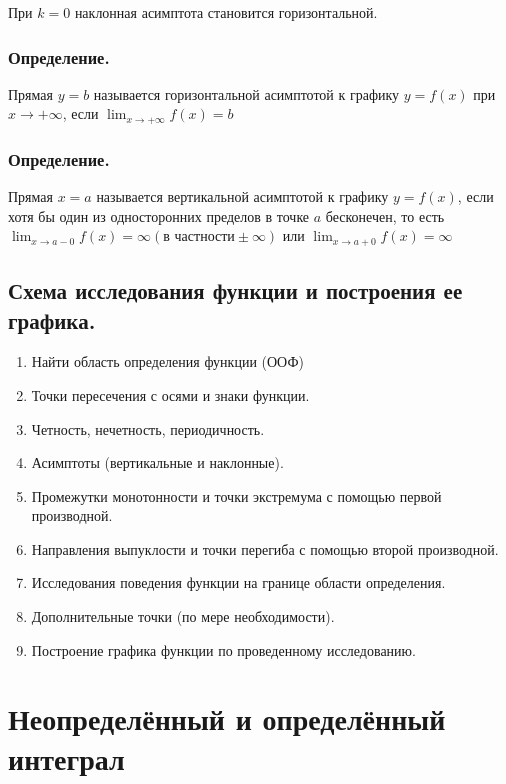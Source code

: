 \documentclass[a4paper,12pt]{article}
\theoremstyle{plain} %
\theoremstyle{definition} %
\theoremstyle{remark} %
\begin{document}
При $k = 0$ наклонная асимптота становится горизонтальной.

\subsubsection*{Определение.}
Прямая $y = b$ называется горизонтальной асимптотой к графику $y = f(x)$ при $x \rightarrow +\infty$, если $\lim_{x \rightarrow +\infty} f(x) = b$

\subsubsection*{Определение.}
Прямая $x = a$ называется вертикальной асимптотой к графику $y = f(x)$, если хотя бы один из односторонних пределов в точке $a$ бесконечен, то есть $\lim_{x \rightarrow a - 0}f(x) = \infty (\text{в частности} \pm \infty)$ или $\lim_{x \rightarrow a + 0}f(x) = \infty$



\newpage
\subsection*{Схема исследования функции и построения ее графика.                                                      }

\begin{enumerate}
	\item Найти область определения функции (ООФ)
	\item Точки пересечения с осями и знаки функции.
	\item Четность, нечетность, периодичность.
	\item Асимптоты (вертикальные и наклонные).
	\item Промежутки монотонности и точки экстремума с помощью первой производной.
	\item Направления выпуклости и точки перегиба с помощью второй производной.
	\item Исследования поведения функции на границе области определения.
	\item Дополнительные точки (по мере необходимости).
	\item Построение графика функции по проведенному исследованию.
\end{enumerate}



\newpage
\section*{Неопределённый и определённый интеграл}
\end{document}
